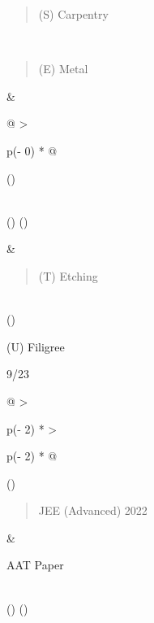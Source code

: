 \documentclass[
]{article}
\begin{document}
\begin{longtable}[]
\begin{minipage}[t]{\linewidth}
\begin{quote}
(S) Carpentry
\end{quote}
\end{minipage} \\
\begin{minipage}[t]{\linewidth}\raggedright
\begin{quote}
(E) Metal
\end{quote}
\end{minipage} & \begin{minipage}[t]{\linewidth}\raggedright
\begin{longtable}[]{@{}
  >{\raggedright\arraybackslash}p{(\columnwidth - 0\tabcolsep) * }@{}}
\toprule()
\begin{minipage}[b]{\linewidth}\raggedright
\end{minipage} \\
\midrule()
\endhead
\bottomrule()
\end{longtable}
\end{minipage} & \begin{minipage}[t]{\linewidth}\raggedright
\begin{quote}
(T) Etching
\end{quote}
\end{minipage} \\
\bottomrule()
\end{longtable}

(U) Filigree

9/23

\begin{longtable}[]{@{}
  >{\raggedright\arraybackslash}p{(\columnwidth - 2\tabcolsep) * }
  >{\raggedright\arraybackslash}p{(\columnwidth - 2\tabcolsep) * }@{}}
\toprule()
\begin{minipage}[b]{\linewidth}\raggedright
\begin{quote}
JEE (Advanced) 2022
\end{quote}
\end{minipage} & \begin{minipage}[b]{\linewidth}\raggedright
AAT Paper
\end{minipage} \\
\midrule()
\endhead
\bottomrule()
\end{longtable}
\end{document}
